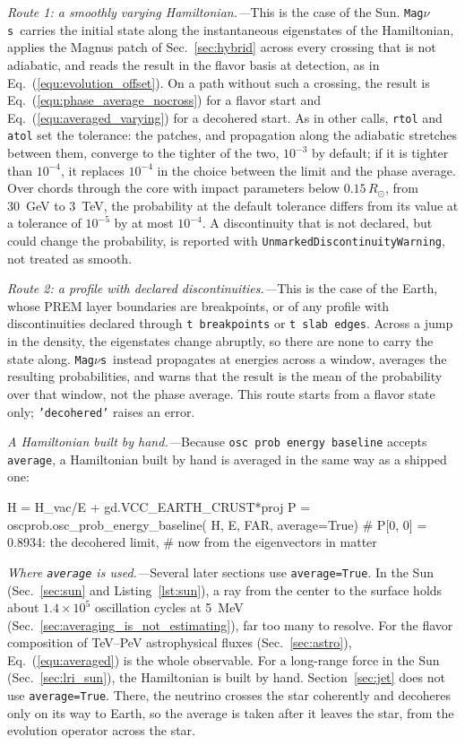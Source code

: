 \documentclass[final,5p,times,twocolumn,sort,compress]{elsarticle}
\makeatletter
\newcommand{\eq}{Eq.}
\DeclareRobustCommand{\_}{%
  \ifmmode\nfss@text{\textunderscore}\else\textunderscore\allowbreak\fi}
\newcommand{\equ}[1]{\eq~(\ref{equ:#1})}
\newcommand{\magnus}{{\tt Mag}\ensuremath{\nu}{\tt s}}
\makeatother
\begin{document}
\smallskip

\textit{Route 1: a smoothly varying Hamiltonian.---}This is the case of the Sun. \magnus\ carries the initial state along the instantaneous eigenstates of the Hamiltonian, applies the Magnus patch of Sec.~\ref{sec:hybrid} across every crossing that is not adiabatic, and reads the result in the flavor basis at detection, as in \equ{evolution_offset}. On a path without such a crossing, the result is \equ{phase_average_nocross} for a flavor start and \equ{averaged_varying} for a decohered start. As in other calls, {\tt rtol} and {\tt atol} set the tolerance: the patches, and propagation along the adiabatic stretches between them, converge to the tighter of the two, $10^{-3}$ by default; if it is tighter than $10^{-4}$, it replaces $10^{-4}$ in the choice between the limit and the phase average. Over chords through the core with impact parameters below $0.15\,R_\odot$, from 30~GeV to 3~TeV, the probability at the default tolerance differs from its value at a tolerance of $10^{-5}$ by at most $10^{-4}$. A discontinuity that is not declared, but could change the probability, is reported with {\tt UnmarkedDiscontinuityWarning}, not treated as smooth.

\smallskip

\textit{Route 2: a profile with declared discontinuities.---}This is the case of the Earth, whose PREM layer boundaries are breakpoints, or of any profile with discontinuities declared through {\tt t\_breakpoints} or {\tt t\_slab\_edges}. Across a jump in the density, the eigenstates change abruptly, so there are none to carry the state along. \magnus\ instead propagates at energies across a window, averages the resulting probabilities, and warns that the result is the mean of the probability over that window, not the phase average. This route starts from a flavor state only; {\tt 'decohered'} raises an error.

\smallskip

\textit{A Hamiltonian built by hand.---}Because {\tt osc\_prob\_energy\_baseline} accepts {\tt average}, a Hamiltonian built by hand is averaged in the same way as a shipped one:
\begin{pysnip}
H = H_vac/E + gd.VCC_EARTH_CRUST*proj
P = oscprob.osc_prob_energy_baseline(
    H, E, FAR, average=True)
# P[0, 0] = 0.8934: the decohered limit,
# now from the eigenvectors in matter
\end{pysnip}

\smallskip

\textit{Where {\tt average} is used.---}Several later sections use {\tt average=True}. In the Sun (Sec.~\ref{sec:sun} and Listing~\ref{lst:sun}), a ray from the center to the surface holds about $1.4 \times 10^{5}$ oscillation cycles at 5~MeV (Sec.~\ref{sec:averaging_is_not_estimating}), far too many to resolve. For the flavor composition of TeV--PeV astrophysical fluxes (Sec.~\ref{sec:astro}), \equ{averaged} is the whole observable. For a long-range force in the Sun (Sec.~\ref{sec:lri_sun}), the Hamiltonian is built by hand. Section~\ref{sec:jet} does not use {\tt average=True}. There, the neutrino crosses the star coherently and decoheres only on its way to Earth, so the average is taken after it leaves the star, from the evolution operator across the star.
\end{document}
